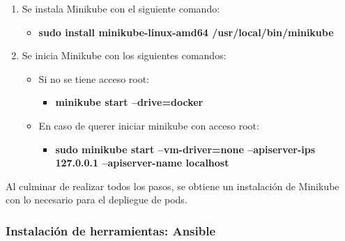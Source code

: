 \begin{enumerate}
    \item Se instala Minikube con el siguiente comando: 
    \begin{itemize}
        \item \textbf{sudo install minikube-linux-amd64 /usr/local/bin/minikube}
    \end{itemize}
    \item Se inicia Minikube con los siguientes comandos:
    \begin{itemize}
        \item Si no se tiene acceso root: 
        \begin{itemize}
            \item \textbf{minikube start --drive=docker}
        \end{itemize}
        \item En caso de querer iniciar minikube con acceso root: 
        \begin{itemize}
            \item \textbf{sudo minikube start --vm-driver=none --apiserver-ips 127.0.0.1 --apiserver-name localhost}
        \end{itemize}
    \end{itemize}
\end{enumerate}
\par Al culminar de realizar todos los pasos, se obtiene un instalación de Minikube con lo necesario para el depliegue de pods.


\subsubsection{Instalación de herramientas: Ansible}

